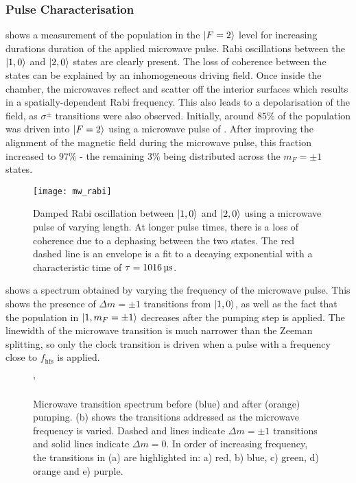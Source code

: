 \subsubsection{Pulse Characterisation}
 shows a measurement of the population in the \(\ket{F=2}\) level for increasing durations duration of the applied microwave pulse. Rabi oscillations between the \(\ket{1,0}\) and \(\ket{2,0}\) states are clearly present. The loss of coherence between the states can be explained by an inhomogeneous driving field. Once inside the chamber, the microwaves reflect and scatter off the interior surfaces which results in a spatially-dependent Rabi frequency. This also leads to a depolarisation of the field, as \(\sigma^{\pm}\) transitions were also observed. Initially, around \(85\%\) of the population was driven into \(\ket{F=2}\) using a microwave pulse of . After improving the alignment of the magnetic field during the microwave pulse, this fraction increased to \(97\%\) - the remaining 3\% being distributed across the \(m_F = \pm 1\) states.

\begin{figure}[!htbp]
    \centering
    \texttt{[image: mw\_rabi]}
    \caption[Microwave Rabi oscillation between \(\ket{1,0}\) and \(\ket{2,0}\)]{Damped Rabi oscillation between \(\ket{1,0}\) and \(\ket{2,0}\) using a microwave pulse of varying length. At longer pulse times, there is a loss of coherence due to a dephasing between the two states. The red dashed line is an envelope is a fit to a decaying exponential with a characteristic time of \(\tau = \sivalue{1016}{\micro\second}\).}
    \label{fig:mw_rabi}
\end{figure}
\par\noindent
{} shows a spectrum obtained by varying the frequency of the microwave pulse. This shows the presence of \(\Delta m = \pm 1 \) transitions from \(\ket{1,0}\), as well as the fact that the population in \(\ket{1,m_F=\pm 1}\) decreases after the  pumping step is applied. The linewidth of the microwave transition is much narrower than the Zeeman splitting, so only the clock transition is driven when a pulse with a frequency close to \(f_\text{hfs}\) is applied.
\begin{figure}[!htbp]
    \centering
    \def\svgwidth{\columnwidth}
    \subfloat[][]{\scalebox{0.7}{}\label{fig:microwave_spectrum}}
    \subfloat[][]{\scalebox{0.3}{\raisebox{3ex}{}}}
    \caption[Microwave transition spectrum]{Microwave transition spectrum before (blue) and after (orange)  pumping. (b) shows the transitions addressed as the microwave frequency is varied. Dashed and lines indicate \(\Delta m = \pm 1\) transitions and solid lines indicate \(\Delta m = 0\). In order of increasing frequency, the transitions in (a) are highlighted in: a) red, b) blue, c) green, d) orange and e) purple.} 
    \label{fig:microwave_data}'
\end{figure}

